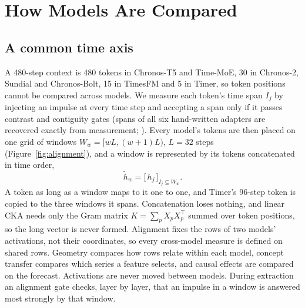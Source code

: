 \section{How Models Are Compared}
\label{sec:methods}

\subsection{A common time axis}
\label{sec:alignment}

A 480-step context is 480 tokens in Chronos-T5 and Time-MoE, 30 in Chronos-2, Sundial and Chronos-Bolt, 15 in TimesFM
and 5 in Timer, so token positions cannot be compared across models. We measure each token's time span $I_j$ by
injecting an impulse at every time step and accepting a span only if it passes contrast and contiguity gates (spans of
all six hand-written adapters are recovered exactly from measurement; ). Every model's tokens are then placed
on one grid of windows $W_w=[wL,(w+1)L)$, $L=32$ steps (Figure~\ref{fig:alignment}), and a window is represented by its
tokens concatenated in time order,
\begin{equation}
  \tilde h_w = \big[\,h_j\,\big]_{I_j\subseteq W_w}.
  \label{eq:pooling}
\end{equation}
A token as long as a window maps to it one to one, and Timer's 96-step token is copied to the three windows it spans.
Concatenation loses nothing, and linear CKA needs only the Gram matrix $K=\sum_p X_pX_p^{\top}$ summed over token
positions, so the long vector is never formed. Alignment fixes the rows of two models' activations, not their
coordinates, so every cross-model measure is defined on shared rows. Geometry compares how rows relate within each model,
concept transfer compares which series a feature selects, and causal effects are compared on the forecast. Activations
are never moved between models. During extraction an alignment gate checks, layer by layer, that an impulse in a window
is answered most strongly by that window.

